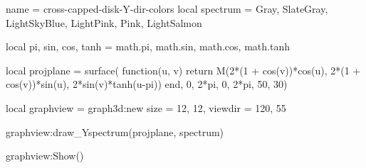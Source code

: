\documentclass{standalone}
\begin{document}
\begin{luadraw}{name = cross-capped-disk-Y-dir-colors}
local spectrum = {Gray, SlateGray, LightSkyBlue, LightPink, Pink, LightSalmon}

local pi, sin, cos, tanh = math.pi, math.sin, math.cos, math.tanh

local projplane = surface(
  function(u, v)
    return M(2*(1 + cos(v))*cos(u), 2*(1 + cos(v))*sin(u), 2*sin(v)*tanh(u-pi))
  end,
  0, 2*pi, 0,  2*pi,
  {50, 30})

local graphview = graph3d:new{
  size    = {12, 12},
  viewdir = {120, 55}
}

graphview:draw_Yspectrum(projplane, spectrum)

graphview:Show()
\end{luadraw}
\end{document}
